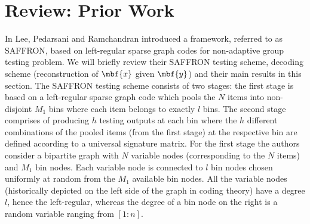 \documentclass[conference,,twocolumn]{IEEEtran}
\DeclareMathOperator*{\bigORtxt}{\scalerel*{\text{$\vee$}}{\textstyle\sum}}
\begin{document}
%

\section{Review: Prior Work}
\label{Sec:PriorWork}
In \cite{lee2015saffron} Lee, Pedarsani and Ramchandran introduced a framework, referred to as SAFFRON, based on left-regular sparse graph codes for non-adaptive group testing problem. We will briefly review their SAFFRON testing scheme, decoding scheme (reconstruction of $\mbf{x}$ given $\mbf{y}$) and their main results in this section. The SAFFRON testing scheme consists of two stages: the first stage is based on a left-regular sparse graph code which pools the $N$ items into non-disjoint $M_1$ bins where each item belongs to exactly $l$ bins. The second stage comprises of producing $h$ testing outputs at each bin where the $h$ different combinations of the pooled items (from the first stage) at the respective bin are defined according to a universal signature matrix. For the first stage the authors consider a bipartite graph with $N$ variable nodes (corresponding to the $N$ items) and $M_1$ bin nodes. Each variable node is connected to $l$ bin nodes chosen uniformly at random from the $M_1$ available bin nodes. All the variable nodes (historically depicted on the left side of the graph in coding theory) have a degree $l$, hence the left-regular, whereas the degree of a bin node on the right is a random variable ranging from $[1:n]$.
\end{document}
